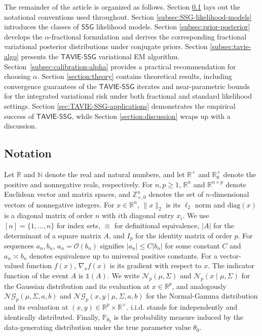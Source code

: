 \documentclass[12pt]{article}
\numberwithin{equation}{section}
\newcommand{\ssg}{\mathsf{SSG}}
\newcommand{\tssg}{\mathsf{TAVIE}\text{-}\mathsf{SSG}}
\begin{document}
The remainder of the article is organized as follows. Section \ref{section:notation} lays out the notational conventions used throughout. Section \ref{subsec:SSG-likelihood-models} introduces the classes of $\ssg$ likelihood models. Section \ref{subsec:prior-posterior} develops the $\alpha$-fractional formulation and derives the corresponding fractional variational posterior distributions under conjugate priors. Section \ref{subsec:tavie-algo} presents the $\tssg$ variational EM algorithm. Section~\ref{subsec:calibration-alpha} provides a practical recommendation for choosing $\alpha$. Section \ref{section:theory} contains theoretical results, including convergence guarantees of the $\tssg$ iterates and near-parametric bounds for the integrated variational risk under both fractional and standard likelihood settings. Section \ref{sec:TAVIE-SSG-applications} demonstrates the empirical success of $\tssg$, while Section \ref{section:discussion} wraps up with a discussion.


\subsection{Notation}\label{section:notation}

Let $\mathbb{R}$ and $\mathbb{N}$ denote the real and natural numbers, and let $\mathbb{R}^{+}$ and $\mathbb{R}_{0}^{+}$ denote the positive and nonnegative reals, respectively. For $n,p\ge 1$, $\mathbb{R}^{n}$ and $\mathbb{R}^{n\times p}$ denote Euclidean vector and matrix spaces, and $\mathbb{Z}_{+,0}^{n}$ denotes the set of $n$-dimensional vectors of nonnegative integers. For  $x \in \mathbb{R}^{n}$, $\lVert x\rVert_{2}$ is its $\ell_2$ norm and $\mathrm{diag}(x)$ is a diagonal matrix of order $n$ with $i$th diagonal entry $x_i$. We use $[n] = \{1, \ldots, n\}$ for index sets, $\equiv$ for definitional equivalence, $|A|$ for the determinant of a square matrix $A$, and $I_p$ for the identity matrix of order $p$. For sequences $a_n, b_n$, $a_n = \mathcal{O}(b_n)$ signifies $|a_n| \leq C |b_n|$ for some constant $C$ and $a_n \asymp b_n$ denotes equivalence up to universal positive constants. For a vector-valued function $f(x)$, $\nabla_{x} f(x)$ is its gradient with respect to $x$. The indicator function of the event $A$ is $\mathds{1}(A)$. We write $\mathcal{N}_{p}(\mu, \Sigma)$ and $\mathcal{N}_{p}(x\mid \mu, \Sigma)$ for the Gaussian distribution and its evaluation at $x\in \mathbb{R}^{p}$, and analogously $\mathcal{NG}_{p}(\mu, \Sigma, a, b)$ and $\mathcal{NG}_{p}(x, y \mid \mu, \Sigma, a, b)$ for the Normal-Gamma distribution and its evaluation at $(x, y) \in \mathbb{R}^{p}\times \mathbb{R}^{+}$. 
i.i.d. stands for independently and identically distributed. 
Finally, $\mathbb{P}_{\theta_0}$ is the probability measure induced by the data-generating distribution under the true parameter value $\theta_0$.
\end{document}
